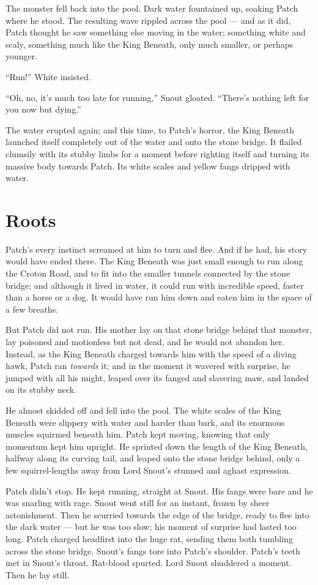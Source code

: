 \documentclass[12pt]{memoir}
\begin{document}
The monster fell back into the pool. Dark water fountained up, soaking
Patch where he stood. The resulting wave rippled across the pool — and
as it did, Patch thought he saw something else moving in the water;
something white and scaly, something much like the King Beneath, only
much smaller, or perhaps younger.

“Run!” White insisted.

“Oh, no, it’s much too late for running,” Snout gloated. “There’s
nothing left for you now but dying.”

The water erupted again; and this time, to Patch’s horror, the King
Beneath launched itself completely out of the water and onto the stone
bridge. It flailed clumsily with its stubby limbs for a moment before
righting itself and turning its massive body towards Patch. Its white
scales and yellow fangs dripped with water.


\section{Roots}

Patch’s every instinct screamed at him to turn and flee. And if he
had, his story would have ended there. The King Beneath was just small
enough to run along the Croton Road, and to fit into the smaller
tunnels connected by the stone bridge; and although it lived in water,
it could run with incredible speed, faster than a horse or a dog. It
would have run him down and eaten him in the space of a few breaths.

But Patch did not run. His mother lay on that stone bridge behind that
monster, lay poisoned and motionless but not dead, and he would not
abandon her. Instead, as the King Beneath charged towards him with the
speed of a diving hawk, Patch ran \textit{towards} it; and in the
moment it wavered with surprise, he jumped with all his might, leaped
over its fanged and slavering maw, and landed on its stubby neck.

He almost skidded off and fell into the pool. The white scales of the
King Beneath were slippery with water and harder than bark, and its
enormous muscles squirmed beneath him. Patch kept moving, knowing that
only momentum kept him upright. He sprinted down the length of the
King Beneath, halfway along its curving tail, and leaped onto the
stone bridge behind, only a few squirrel-lengths away from Lord
Snout’s stunned and aghast expression.

Patch didn’t stop. He kept running, straight at Snout. His fangs were
bare and he was snarling with rage. Snout went still for an instant,
frozen by sheer astonishment. Then he scurried towards the edge of the
bridge, ready to flee into the dark water — but he was too slow; his
moment of surprise had lasted too long. Patch charged headfirst into
the huge rat, sending them both tumbling across the stone
bridge. Snout’s fangs tore into Patch’s shoulder. Patch’s teeth met in
Snout’s throat. Rat-blood spurted. Lord Snout shuddered a moment. Then
he lay still.
\end{document}
